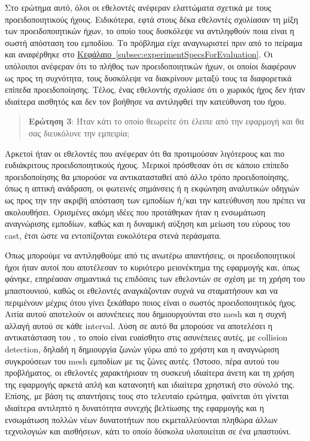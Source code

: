 Στο ερώτημα αυτό, όλοι οι εθελοντές ανέφεραν ελαττώματα σχετικά με τους προειδοποιητικούς ήχους. Ειδικότερα, εφτά στους δέκα εθελοντές σχολίασαν τη μίξη των προειδοποιητικών ήχων, το οποίο τους δυσκόλεψε να αντιληφθούν ποια είναι η σωστή απόσταση του εμποδίου. Το πρόβλημα είχε αναγνωριστεί πριν από το πείραμα και αναφέρθηκε στο \hyperref[subsec:experimentSpecsForEvaluation]{Κεφάλαιο~\ref*{subsec:experimentSpecsForEvaluation}}. Οι υπόλοιποι ανέφεραν ότι το πλήθος των προειδοποιητικών ήχων, οι οποίοι διαφέρουν ως προς τη συχνότητα, τους δυσκόλεψε να διακρίνουν μεταξύ τους τα διαφορετικά επίπεδα προειδοποίησης. Τέλος, ένας εθελοντής σχολίασε ότι ο χωρικός ήχος δεν ήταν ιδιαίτερα αισθητός και δεν τον βοήθησε να αντιληφθεί την κατεύθυνση του ήχου.
\\[\baselineskip]
\begin{quote}
    \textbf{Ερώτηση 3}: Ήταν κάτι το οποίο θεωρείτε ότι έλειπε από την εφαρμογή και θα σας διευκόλυνε την εμπειρία;
\end{quote}

Αρκετοί ήταν οι εθελοντές που ανέφεραν ότι θα προτιμούσαν λιγότερους και πιο ευδιάκριτους προειδοποιητικούς ήχους. Μερικοί πρόσθεσαν ότι σε κάποιο επίπεδο προειδοποίησης θα μπορούσε να αντικατασταθεί από άλλο τρόπο προειδοποίησης, όπως η απτική ανάδραση, οι φωτεινές σημάνσεις ή η εκφώνηση αναλυτικών οδηγιών ως προς την την ακριβή απόσταση των εμποδίων ή/και την κατεύθυνση που πρέπει να ακολουθήσει. Ορισμένες ακόμη ιδέες που προτάθηκαν ήταν η ενσωμάτωση αναγνώρισης εμποδίων, καθώς και η δυναμική αύξηση και μείωση του εύρους του cast, έτσι ώστε να εντοπίζονται ευκολότερα στενά περάσματα.

Όπως μπορούμε να αντιληφθούμε από τις ανωτέρω απαντήσεις, οι προειδοποιητικοί ήχοι ήταν αυτοί που αποτέλεσαν το κυριότερο μειονέκτημα της εφαρμογής και, όπως φάνηκε, επηρέασαν σημαντικά τις επιδόσεις των εθελοντών σε σχέση με τη χρήση του μπαστουνιού, καθώς οι εθελοντές αναγκάζονταν συχνά να σταματήσουν και να περιμένουν μέχρις ότου γίνει ξεκάθαρο ποιος είναι ο σωστός προειδοποιητικός ήχος. Αιτία αυτού αποτελούν οι ασυνέπειες που δημιουργούνται στο mesh και η συχνή αλλαγή αυτού σε κάθε interval. Λύση σε αυτό θα μπορούσε να αποτελέσει η αντικατάσταση του , το οποίο είναι ευαίσθητο στις ασυνέπειες αυτές, με collision detection, δηλαδή η δημιουργία ζωνών γύρω από το χρήστη και η αναγνώριση συγκρούσεων του mesh εμποδίων με τις ζώνες αυτές. Ώστοσο, πέρα αυτού του προβλήματος, οι εθελοντές χαρακτήρισαν τη συσκευή ιδιαίτερα άνετη και τη χρήση της εφαρμογής αρκετά απλή και κατανοητή και ιδιαίτερα χρηστική στο σύνολό της. Επίσης, με βάση τις απαντήσεις τους στο τελευταίο ερώτημα, φαίνεται ότι γίνεται ιδιαίτερα αντιληπτό η δυνατότητα συνεχής βελτίωσης της εφαρμογής και η ενσωμάτωση πολλών νέων δυνατοτήτων που εκμεταλλεύονται πληθώρα άλλων τεχνολογιών και αισθήσεων, κάτι το οποίο δύσκολα υλοποιείται σε ένα μπαστούνι.